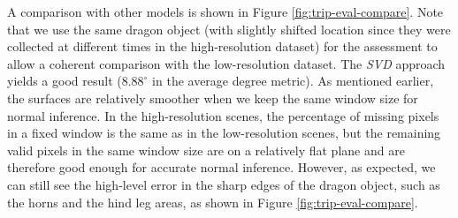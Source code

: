 A comparison with other models is shown in Figure \ref{fig:trip-eval-compare}. Note that we use the same dragon object (with slightly shifted location since they were collected at different times in the high-resolution dataset) for the assessment to allow a coherent comparison with the low-resolution dataset. The \textit{SVD} approach yields a good result ($8.88^\circ $ in the average degree metric). As mentioned earlier, the surfaces are relatively smoother when we keep the same window size for normal inference. In the high-resolution scenes, the percentage of missing pixels in a fixed window is the same as in the low-resolution scenes, but the remaining valid pixels in the same window size are on a relatively flat plane and are therefore good enough for accurate normal inference. However, as expected, we can still see the high-level error in the sharp edges of the dragon object, such as the horns and the hind leg areas, as shown in Figure \ref{fig:trip-eval-compare}.




